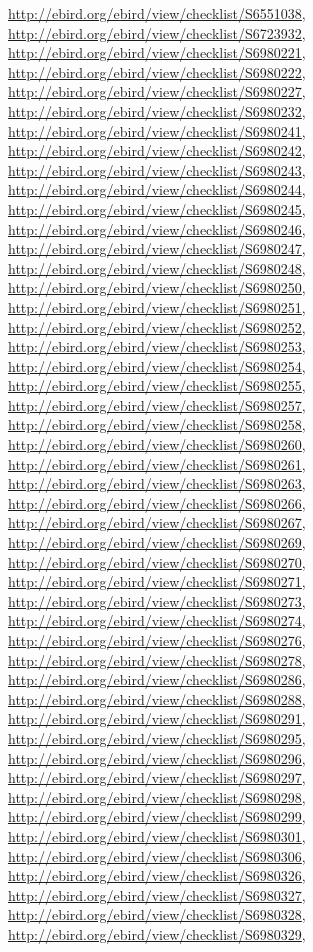 \documentclass[9pt, article]{memoir}
\begin{document}
\begin{multicols}{2}
\url{http://ebird.org/ebird/view/checklist/S6551038}, 
\url{http://ebird.org/ebird/view/checklist/S6723932}, 
\url{http://ebird.org/ebird/view/checklist/S6980221}, 
\url{http://ebird.org/ebird/view/checklist/S6980222}, 
\url{http://ebird.org/ebird/view/checklist/S6980227}, 
\url{http://ebird.org/ebird/view/checklist/S6980232}, 
\url{http://ebird.org/ebird/view/checklist/S6980241}, 
\url{http://ebird.org/ebird/view/checklist/S6980242}, 
\url{http://ebird.org/ebird/view/checklist/S6980243}, 
\url{http://ebird.org/ebird/view/checklist/S6980244}, 
\url{http://ebird.org/ebird/view/checklist/S6980245}, 
\url{http://ebird.org/ebird/view/checklist/S6980246}, 
\url{http://ebird.org/ebird/view/checklist/S6980247}, 
\url{http://ebird.org/ebird/view/checklist/S6980248}, 
\url{http://ebird.org/ebird/view/checklist/S6980250}, 
\url{http://ebird.org/ebird/view/checklist/S6980251}, 
\url{http://ebird.org/ebird/view/checklist/S6980252}, 
\url{http://ebird.org/ebird/view/checklist/S6980253}, 
\url{http://ebird.org/ebird/view/checklist/S6980254}, 
\url{http://ebird.org/ebird/view/checklist/S6980255}, 
\url{http://ebird.org/ebird/view/checklist/S6980257}, 
\url{http://ebird.org/ebird/view/checklist/S6980258}, 
\url{http://ebird.org/ebird/view/checklist/S6980260}, 
\url{http://ebird.org/ebird/view/checklist/S6980261}, 
\url{http://ebird.org/ebird/view/checklist/S6980263}, 
\url{http://ebird.org/ebird/view/checklist/S6980266}, 
\url{http://ebird.org/ebird/view/checklist/S6980267}, 
\url{http://ebird.org/ebird/view/checklist/S6980269}, 
\url{http://ebird.org/ebird/view/checklist/S6980270}, 
\url{http://ebird.org/ebird/view/checklist/S6980271}, 
\url{http://ebird.org/ebird/view/checklist/S6980273}, 
\url{http://ebird.org/ebird/view/checklist/S6980274}, 
\url{http://ebird.org/ebird/view/checklist/S6980276}, 
\url{http://ebird.org/ebird/view/checklist/S6980278}, 
\url{http://ebird.org/ebird/view/checklist/S6980286}, 
\url{http://ebird.org/ebird/view/checklist/S6980288}, 
\url{http://ebird.org/ebird/view/checklist/S6980291}, 
\url{http://ebird.org/ebird/view/checklist/S6980295}, 
\url{http://ebird.org/ebird/view/checklist/S6980296}, 
\url{http://ebird.org/ebird/view/checklist/S6980297}, 
\url{http://ebird.org/ebird/view/checklist/S6980298}, 
\url{http://ebird.org/ebird/view/checklist/S6980299}, 
\url{http://ebird.org/ebird/view/checklist/S6980301}, 
\url{http://ebird.org/ebird/view/checklist/S6980306}, 
\url{http://ebird.org/ebird/view/checklist/S6980326}, 
\url{http://ebird.org/ebird/view/checklist/S6980327}, 
\url{http://ebird.org/ebird/view/checklist/S6980328}, 
\url{http://ebird.org/ebird/view/checklist/S6980329}, 

\end{multicols}
\end{document}

